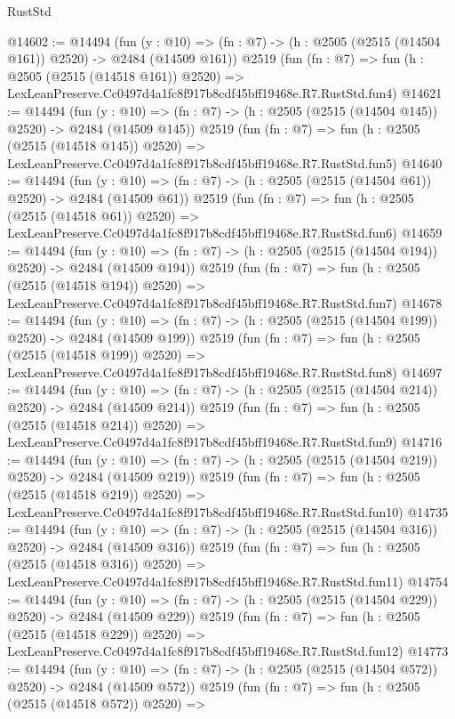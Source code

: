 \begin{lexlean}{RustStd}
\begin{coremodule}
@14602 := @14494
    (fun (y : @10) => (fn : @7) -> (h : @2505 (@2515 (@14504 @161)) @2520) -> @2484 (@14509 @161))
    @2519
    (fun (fn : @7) =>
    fun (h : @2505 (@2515 (@14518 @161)) @2520) =>
    LexLeanPreserve.Cc0497d4a1fc8f917b8cdf45bff19468e.R7.RustStd.fun4)
@14621 := @14494
    (fun (y : @10) => (fn : @7) -> (h : @2505 (@2515 (@14504 @145)) @2520) -> @2484 (@14509 @145))
    @2519
    (fun (fn : @7) =>
    fun (h : @2505 (@2515 (@14518 @145)) @2520) =>
    LexLeanPreserve.Cc0497d4a1fc8f917b8cdf45bff19468e.R7.RustStd.fun5)
@14640 := @14494
    (fun (y : @10) => (fn : @7) -> (h : @2505 (@2515 (@14504 @61)) @2520) -> @2484 (@14509 @61))
    @2519
    (fun (fn : @7) =>
    fun (h : @2505 (@2515 (@14518 @61)) @2520) =>
    LexLeanPreserve.Cc0497d4a1fc8f917b8cdf45bff19468e.R7.RustStd.fun6)
@14659 := @14494
    (fun (y : @10) => (fn : @7) -> (h : @2505 (@2515 (@14504 @194)) @2520) -> @2484 (@14509 @194))
    @2519
    (fun (fn : @7) =>
    fun (h : @2505 (@2515 (@14518 @194)) @2520) =>
    LexLeanPreserve.Cc0497d4a1fc8f917b8cdf45bff19468e.R7.RustStd.fun7)
@14678 := @14494
    (fun (y : @10) => (fn : @7) -> (h : @2505 (@2515 (@14504 @199)) @2520) -> @2484 (@14509 @199))
    @2519
    (fun (fn : @7) =>
    fun (h : @2505 (@2515 (@14518 @199)) @2520) =>
    LexLeanPreserve.Cc0497d4a1fc8f917b8cdf45bff19468e.R7.RustStd.fun8)
@14697 := @14494
    (fun (y : @10) => (fn : @7) -> (h : @2505 (@2515 (@14504 @214)) @2520) -> @2484 (@14509 @214))
    @2519
    (fun (fn : @7) =>
    fun (h : @2505 (@2515 (@14518 @214)) @2520) =>
    LexLeanPreserve.Cc0497d4a1fc8f917b8cdf45bff19468e.R7.RustStd.fun9)
@14716 := @14494
    (fun (y : @10) => (fn : @7) -> (h : @2505 (@2515 (@14504 @219)) @2520) -> @2484 (@14509 @219))
    @2519
    (fun (fn : @7) =>
    fun (h : @2505 (@2515 (@14518 @219)) @2520) =>
    LexLeanPreserve.Cc0497d4a1fc8f917b8cdf45bff19468e.R7.RustStd.fun10)
@14735 := @14494
    (fun (y : @10) => (fn : @7) -> (h : @2505 (@2515 (@14504 @316)) @2520) -> @2484 (@14509 @316))
    @2519
    (fun (fn : @7) =>
    fun (h : @2505 (@2515 (@14518 @316)) @2520) =>
    LexLeanPreserve.Cc0497d4a1fc8f917b8cdf45bff19468e.R7.RustStd.fun11)
@14754 := @14494
    (fun (y : @10) => (fn : @7) -> (h : @2505 (@2515 (@14504 @229)) @2520) -> @2484 (@14509 @229))
    @2519
    (fun (fn : @7) =>
    fun (h : @2505 (@2515 (@14518 @229)) @2520) =>
    LexLeanPreserve.Cc0497d4a1fc8f917b8cdf45bff19468e.R7.RustStd.fun12)
@14773 := @14494
    (fun (y : @10) => (fn : @7) -> (h : @2505 (@2515 (@14504 @572)) @2520) -> @2484 (@14509 @572))
    @2519
    (fun (fn : @7) =>
    fun (h : @2505 (@2515 (@14518 @572)) @2520) =>

\end{coremodule}
\end{lexlean}
